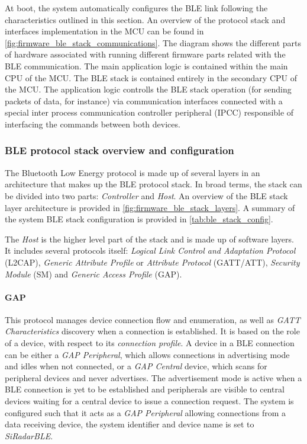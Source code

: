 At boot, the system automatically configures the BLE link following the characteristics outlined in this section. An overview of the protocol stack and interfaces implementation in the MCU can be found in \cref{fig:firmware_ble_stack_communications}. The diagram shows the different parts of hardware associated with running different firmware parts related with the BLE communication. The main application logic is contained within the main CPU of the MCU. The BLE stack is contained entirely in the secondary CPU of the MCU. The application logic controlls the BLE stack operation (for sending packets of data, for instance) via communication interfaces connected with a special inter process communication controller peripheral (IPCC) responsible of interfacing the commands between both devices. %

\subsubsection{BLE protocol stack overview and configuration} \label{sec:ble_stack}

The Bluetooth Low Energy protocol is made up of several layers in an architecture that makes up the BLE protocol stack. In broad terms, the stack can be divided into two parts: \textit{Controller} and \textit{Host}. An overview of the BLE stack layer architecture is provided in \cref{fig:firmware_ble_stack_layers}. A summary of the system BLE stack configuration is provided in \cref{tab:ble_stack_config}.

The \textit{Host} is the higher level part of the stack and is made up of software layers. It includes several protocols itself: \textit{Logical Link Control and Adaptation Protocol} (L2CAP), \textit{Generic Attribute Profile} or \textit{Attribute Protocol} (GATT/ATT), \textit{Security Module} (SM) and \textit{Generic Access Profile} (GAP).

\paragraph{GAP}
This protocol manages device connection flow and enumeration, as well as \textit{GATT Characteristics} discovery when a connection is established. It is based on the role of a device, with respect to its \textit{connection profile}. A device in a BLE connection can be either a \textit{GAP Peripheral}, which allows connections in advertising mode and idles when not connected, or a \textit{GAP Central} device, which scans for peripheral devices and never advertises. The advertisement mode is active when a BLE connection is yet to be established and peripherals are visible to central devices waiting for a central device to issue a connection request. The system is configured such that it acts as a \textit{GAP Peripheral} allowing connections from a data receiving device, the system identifier and device name is set to \textit{SiRadarBLE}.

